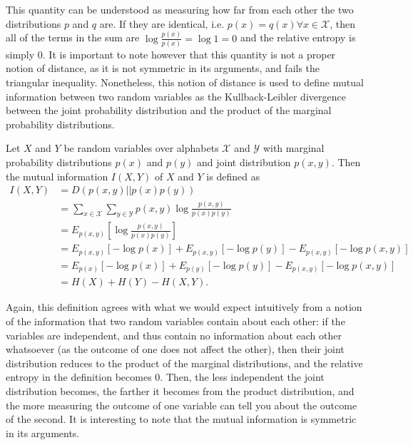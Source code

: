 This quantity can be understood as measuring how far from each other the two distributions $p$ and $q$ are. If they are identical, i.e. $p(x) = q(x) \forall x \in \mathcal{X}$, then all of the terms in the sum are $\log \frac{p(x)}{p(x)} = \log 1 = 0$ and the relative entropy is simply 0. It is important to note however that this quantity is not a proper notion of distance, as it is not symmetric in its arguments, and fails the triangular inequality. %
Nonetheless, this notion of distance is used to define mutual information between two random variables as the Kullback-Leibler divergence between the joint probability distribution and the product of the marginal probability distributions.

\begin{definition}
    Let $X$ and $Y$ be random variables over alphabets $\mathcal{X}$ and $\mathcal{Y}$ with marginal probability distributions $p(x)$ and $p(y)$ and joint distribution $p(x, y)$. Then the mutual information $I(X, Y)$ of $X$ and $Y$ is defined as
    \begin{align}
        I(X, Y) &= D(p(x, y)||p(x)p(y))\\
                &= \sum_{x \in \mathcal{X}} \sum_{y \in \mathcal{Y}} p(x, y) \log \frac{p(x, y)}{p(x)p(y)}\\
                &= E_{p(x, y)}\left[\log \frac{p(x, y)}{p(x)p(y)}\right]\\
                &= E_{p(x, y)}[- \log p(x)] + E_{p(x, y)}[- \log p(y)] - E_{p(x, y)}[- \log p(x, y)]\\
                &= E_{p(x)}[- \log p(x)] + E_{p(y)}[- \log p(y)] - E_{p(x, y)}[- \log p(x, y)]\\
                &= H(X) + H(Y) - H(X, Y).
    \end{align}
\end{definition}

Again, this definition agrees with what we would expect intuitively from a notion of the information that two random variables contain about each other: if the variables are independent, and thus contain no information about each other whatsoever (as the outcome of one does not affect the other), then their joint distribution reduces to the product of the marginal distributions, and the relative entropy in the definition becomes 0. Then, the less independent the joint distribution becomes, the farther it becomes from the product distribution, and the more measuring the outcome of one variable can tell you about the outcome of the second. It is interesting to note that the mutual information is symmetric in its arguments.

